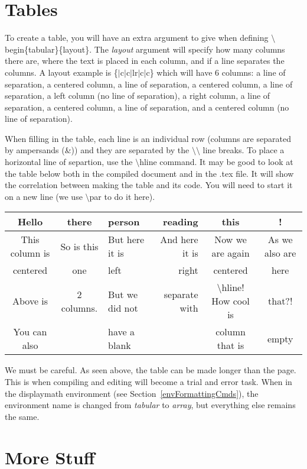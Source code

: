 \documentclass[10pt]{article}
\begin{document}
\section{Tables\label{tableTutorial}}
To create a table, you will have an extra argument to give when defining $ \setminus $begin\{tabular\}\{layout\}.  The \textit{layout} argument will specify how many columns there are, where the text is placed in each column, and if a line separates the columns.  A layout example is \{$|$c$|$c$|$lr$|$c$|$c\} which will have 6 columns: a line of separation, a centered column, a line of separation, a centered column, a line of separation, a left column (no line of separation), a right column, a line of separation, a centered column, a line of separation, and a centered column (no line of separation).
\par
When filling in the table, each line is an individual row (columns are separated by ampersands (\&)) and they are separated by the $ \setminus\setminus $ line breaks.  To place a horizontal line of separtion, use the $ \setminus $hline command.  It may be good to look at the table below both in the compiled document and in the .tex file.  It will show the correlation between making the table and its code.  You will need to start it on a new line (we use $ \setminus $par to do it here).
\par
\begin{tabular}{|c|c|lr|c|c}
\hline
Hello & there & person & reading & this & ! \\
\hline
This column is & So is this & But here it is & And here it is & Now we are again & As we also are \\
centered & one & left & right & centered & here \\
\hline
Above is & 2 columns. & But we did not & separate with & $ \setminus $hline!  How cool is & that?! \\
\hline
You can also & & have a blank & & column that is & empty \\
\hline
\end{tabular}
We must be careful.  As seen above, the table can be made longer than the page.  This is when compiling and editing will become a trial and error task.  When in the displaymath environment (see Section~\ref{envFormattingCmds}), the environment name is changed from \textit{tabular} to \textit{array}, but everything else remains the same.

\section{More Stuff\label{otherThings}}
\end{document}
